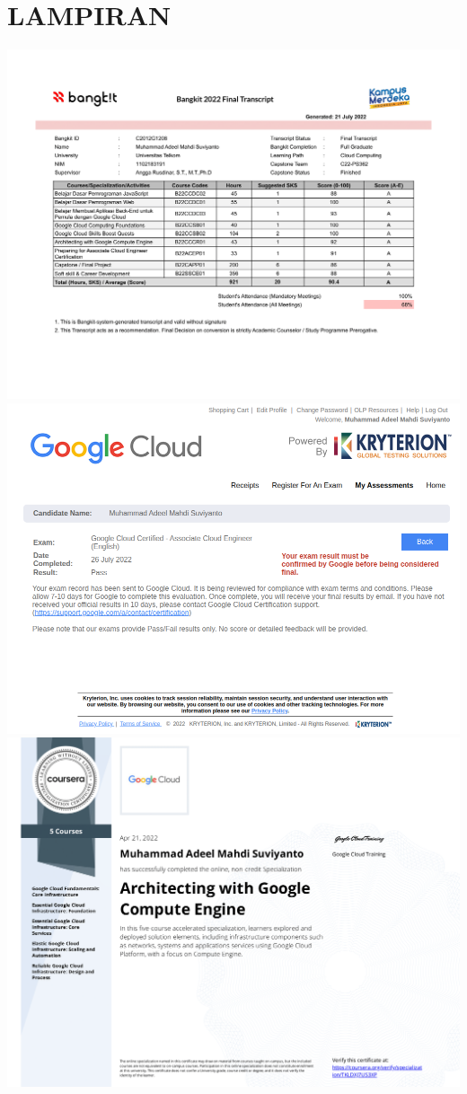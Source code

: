\chapter*{LAMPIRAN}
\includegraphics[scale=0.5]{./assets/transcript}\\
\includegraphics[scale=0.4]{./assets/acepreliminary}
\includegraphics[scale=0.5]{./assets/coursera}\\
